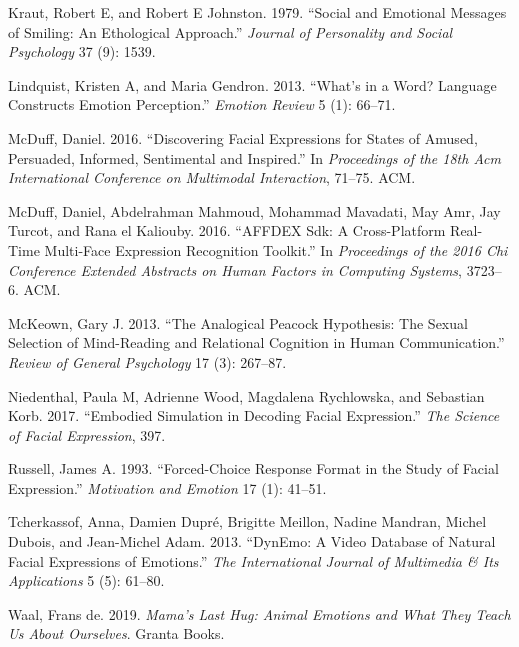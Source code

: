 \documentclass[conference,final,]{IEEEtran}
\begin{document}
\leavevmode\hypertarget{ref-kraut1979social}{}%
Kraut, Robert E, and Robert E Johnston. 1979. ``Social and Emotional
Messages of Smiling: An Ethological Approach.'' \emph{Journal of
Personality and Social Psychology} 37 (9): 1539.

\leavevmode\hypertarget{ref-lindquist2013s}{}%
Lindquist, Kristen A, and Maria Gendron. 2013. ``What's in a Word?
Language Constructs Emotion Perception.'' \emph{Emotion Review} 5 (1):
66--71.

\leavevmode\hypertarget{ref-mcduff2016discovering}{}%
McDuff, Daniel. 2016. ``Discovering Facial Expressions for States of
Amused, Persuaded, Informed, Sentimental and Inspired.'' In
\emph{Proceedings of the 18th Acm International Conference on Multimodal
Interaction}, 71--75. ACM.

\leavevmode\hypertarget{ref-mcduff2016affdex}{}%
McDuff, Daniel, Abdelrahman Mahmoud, Mohammad Mavadati, May Amr, Jay
Turcot, and Rana el Kaliouby. 2016. ``AFFDEX Sdk: A Cross-Platform
Real-Time Multi-Face Expression Recognition Toolkit.'' In
\emph{Proceedings of the 2016 Chi Conference Extended Abstracts on Human
Factors in Computing Systems}, 3723--6. ACM.

\leavevmode\hypertarget{ref-mckeown2013analogical}{}%
McKeown, Gary J. 2013. ``The Analogical Peacock Hypothesis: The Sexual
Selection of Mind-Reading and Relational Cognition in Human
Communication.'' \emph{Review of General Psychology} 17 (3): 267--87.

\leavevmode\hypertarget{ref-niedenthal2017embodied}{}%
Niedenthal, Paula M, Adrienne Wood, Magdalena Rychlowska, and Sebastian
Korb. 2017. ``Embodied Simulation in Decoding Facial Expression.''
\emph{The Science of Facial Expression}, 397.

\leavevmode\hypertarget{ref-russell1993forced}{}%
Russell, James A. 1993. ``Forced-Choice Response Format in the Study of
Facial Expression.'' \emph{Motivation and Emotion} 17 (1): 41--51.

\leavevmode\hypertarget{ref-tcherkassof2013dynemo}{}%
Tcherkassof, Anna, Damien Dupré, Brigitte Meillon, Nadine Mandran,
Michel Dubois, and Jean-Michel Adam. 2013. ``DynEmo: A Video Database of
Natural Facial Expressions of Emotions.'' \emph{The International
Journal of Multimedia \& Its Applications} 5 (5): 61--80.

\leavevmode\hypertarget{ref-de2019mama}{}%
Waal, Frans de. 2019. \emph{Mama's Last Hug: Animal Emotions and What
They Teach Us About Ourselves}. Granta Books.
\end{document}
